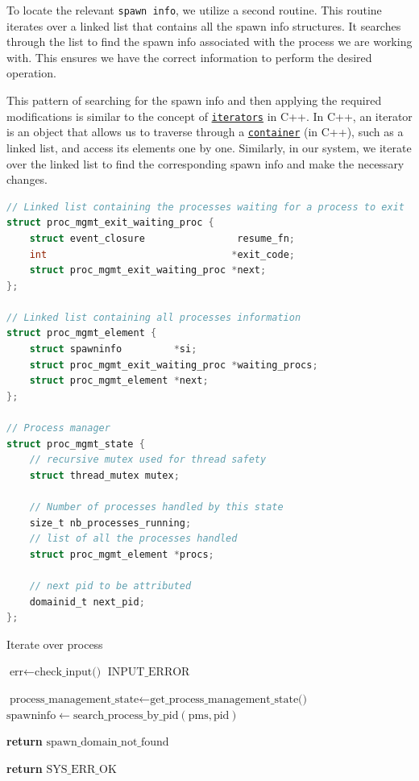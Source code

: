 To locate the relevant \texttt{spawn info}, we utilize a second routine. This routine iterates over a linked list that contains all the spawn info structures. It searches through the list to find the spawn info associated with the process we are working with. This ensures we have the correct information to perform the desired operation.

This pattern of searching for the spawn info and then applying the required modifications is similar to the concept of \href{https://cplusplus.com/reference/iterator/}{\texttt{iterators}} in C++. In C++, an iterator is an object that allows us to traverse through a \href{https://cplusplus.com/reference/stl/}{\texttt{container}} (in C++), such as a linked list, and access its elements one by one. Similarly, in our system, we iterate over the linked list to find the corresponding spawn info and make the necessary changes.


\begin{lstlisting}[caption={Data structures used for the process management},language=C,frame=single,breaklines]
// Linked list containing the processes waiting for a process to exit
struct proc_mgmt_exit_waiting_proc {
    struct event_closure                resume_fn;
    int                                *exit_code;
    struct proc_mgmt_exit_waiting_proc *next;
};

// Linked list containing all processes information
struct proc_mgmt_element {
    struct spawninfo         *si;
    struct proc_mgmt_exit_waiting_proc *waiting_procs;
    struct proc_mgmt_element *next;
};

// Process manager
struct proc_mgmt_state {
    // recursive mutex used for thread safety
    struct thread_mutex mutex;

    // Number of processes handled by this state
    size_t nb_processes_running;
    // list of all the processes handled
    struct proc_mgmt_element *procs;

    // next pid to be attributed
    domainid_t next_pid;
};
\end{lstlisting}

\begin{algorithm}
\caption{Iterate over process}
\begin{algorithmic}[1]

\State $\text{err} \gets \text{check\_input()}$
    \Return $\text{INPUT\_ERROR}$
\EndIf

\State $\text{process\_management\_state} \gets \text{get\_process\_management\_state()}$
\State $\text{spawninfo} \gets \text{search\_process\_by\_pid}(\text{pms}, \text{pid})$

    \State \textbf{return} $\text{spawn\_domain\_not\_found}$
\EndIf

\State {}
\State \textbf{return} $\text{SYS\_ERR\_OK}$
\EndProcedure

\end{algorithmic}
\end{algorithm}

